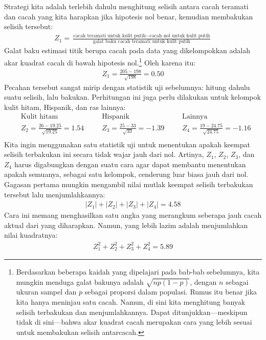 Strategi kita adalah terlebih dahulu menghitung selisih antara cacah teramati dan cacah yang kita harapkan jika hipotesis nol benar, kemudian membakukan selisih tersebut:
\begin{align*}
Z_{1} = \frac{\text{cacah teramati untuk kulit putih} - \text{cacah nol untuk kulit putih}}
				{\text{galat baku cacah teramati untuk kulit putih}}
\end{align*}
Galat baku estimasi titik berupa cacah pada data yang dikelompokkan adalah akar kuadrat cacah di bawah hipotesis nol.\footnote{Berdasarkan beberapa kaidah yang dipelajari pada bab-bab sebelumnya, kita mungkin menduga galat bakunya adalah $\sqrt{np(1-p)}$, dengan $n$ sebagai ukuran sampel dan $p$ sebagai proporsi dalam populasi. Rumus itu benar jika kita hanya meninjau satu cacah. Namun, di sini kita menghitung banyak selisih terbakukan dan menjumlahkannya. Dapat ditunjukkan---meskipun tidak di sini---bahwa akar kuadrat cacah merupakan cara yang lebih sesuai untuk membakukan selisih antarcacah.} Oleh karena itu:
\begin{align*}
Z_1 = \frac{205 - 198}{\sqrt{198}} = 0.50
\end{align*}
Pecahan tersebut sangat mirip dengan statistik uji sebelumnya: hitung dahulu suatu selisih, lalu bakukan. Perhitungan ini juga perlu dilakukan untuk kelompok kulit hitam, Hispanik, dan ras lainnya:
\begin{align*}
&\text{Kulit hitam} && \text{Hispanik}	&&\text{Lainnya} \\
& Z_2 = \frac{26-19.25}{\sqrt{19.25}}=1.54\ \ \ \ 
	&& Z_3 = \frac{25-33}{\sqrt{33}}=-1.39\ \ \ \ 
	&& Z_4 = \frac{19-24.75}{\sqrt{24.75}}=-1.16 \\
\end{align*}
Kita ingin menggunakan satu statistik uji untuk menentukan apakah keempat selisih terbakukan ini secara tidak wajar jauh dari nol. Artinya, $Z_1$, $Z_2$, $Z_3$, dan $Z_4$ harus digabungkan dengan suatu cara agar dapat membantu menentukan apakah semuanya, sebagai satu kelompok, cenderung luar biasa jauh dari nol. Gagasan pertama mungkin mengambil nilai mutlak keempat selisih terbakukan tersebut lalu menjumlahkannya:
\begin{align*}
|Z_1| + |Z_2| + |Z_3| + |Z_4| = 4.58
\end{align*}
Cara ini memang menghasilkan satu angka yang merangkum seberapa jauh cacah aktual dari yang diharapkan. Namun, yang lebih lazim adalah menjumlahkan nilai kuadratnya:
\begin{align*}
Z_1^2 + Z_2^2 + Z_3^2 + Z_4^2 = 5.89
\end{align*}
